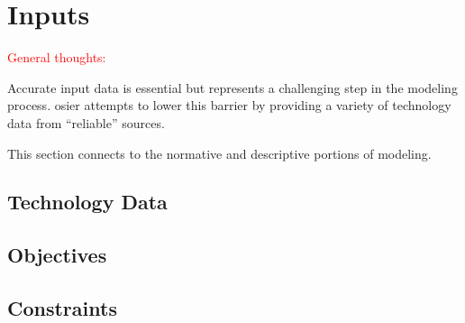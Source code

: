 \section{Inputs}

\textcolor{red}{General thoughts:}

Accurate input data is essential but represents a challenging step in the
modeling process. \ac{osier} attempts to lower this barrier by providing a
variety of technology data from ``reliable'' sources.

This section connects to the normative and descriptive portions of modeling. 

\subsection{Technology Data}

\subsection{Objectives}

\subsection{Constraints}